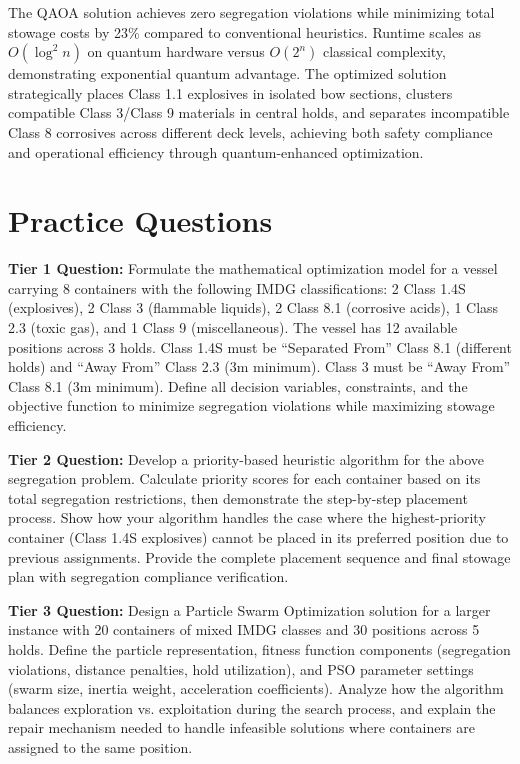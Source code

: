 \documentclass{article}
\begin{document}
The QAOA solution achieves zero segregation violations while minimizing total stowage costs by 23\% compared to conventional heuristics. Runtime scales as $O(\log^2 n)$ on quantum hardware versus $O(2^n)$ classical complexity, demonstrating exponential quantum advantage. The optimized solution strategically places Class 1.1 explosives in isolated bow sections, clusters compatible Class 3/Class 9 materials in central holds, and separates incompatible Class 8 corrosives across different deck levels, achieving both safety compliance and operational efficiency through quantum-enhanced optimization.

\section{Practice Questions}

\textbf{Tier 1 Question:} Formulate the mathematical optimization model for a vessel carrying 8 containers with the following IMDG classifications: 2 Class 1.4S (explosives), 2 Class 3 (flammable liquids), 2 Class 8.1 (corrosive acids), 1 Class 2.3 (toxic gas), and 1 Class 9 (miscellaneous). The vessel has 12 available positions across 3 holds. Class 1.4S must be ``Separated From'' Class 8.1 (different holds) and ``Away From'' Class 2.3 (3m minimum). Class 3 must be ``Away From'' Class 8.1 (3m minimum). Define all decision variables, constraints, and the objective function to minimize segregation violations while maximizing stowage efficiency.

\textbf{Tier 2 Question:} Develop a priority-based heuristic algorithm for the above segregation problem. Calculate priority scores for each container based on its total segregation restrictions, then demonstrate the step-by-step placement process. Show how your algorithm handles the case where the highest-priority container (Class 1.4S explosives) cannot be placed in its preferred position due to previous assignments. Provide the complete placement sequence and final stowage plan with segregation compliance verification.

\textbf{Tier 3 Question:} Design a Particle Swarm Optimization solution for a larger instance with 20 containers of mixed IMDG classes and 30 positions across 5 holds. Define the particle representation, fitness function components (segregation violations, distance penalties, hold utilization), and PSO parameter settings (swarm size, inertia weight, acceleration coefficients). Analyze how the algorithm balances exploration vs. exploitation during the search process, and explain the repair mechanism needed to handle infeasible solutions where containers are assigned to the same position.
\end{document}
